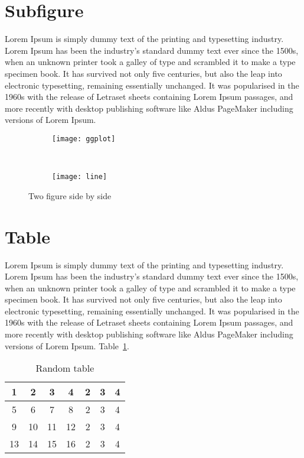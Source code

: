 \section{Subfigure}
Lorem Ipsum is simply dummy text of the printing and typesetting industry. 
Lorem Ipsum has been the industry's standard dummy text ever since the 1500s, 
when an unknown printer took a galley of type and scrambled it to make a type 
specimen book. It has survived not only five centuries, but also the leap into 
electronic typesetting, remaining essentially unchanged. It was popularised in 
the 1960s with the release of Letraset sheets containing Lorem Ipsum passages, 
and more recently with desktop publishing software like Aldus PageMaker 
including versions of Lorem Ipsum.

\begin{figure}
\centering
\begin{subfigure}[b]{0.45\textwidth}
  \centering
  \texttt{[image: ggplot]}
  \caption{}
  \label{fig:im1}
 \end{subfigure}
~
\begin{subfigure}[b]{0.45\textwidth}
  \centering
  \texttt{[image: line]}
  \caption{}
  \label{fig:im2}
\end{subfigure}
\caption{Two figure side by side}
\label{fig:subfigs cap}
\end{figure}

\section{Table}
Lorem Ipsum is simply dummy text of the printing and typesetting industry. 
Lorem Ipsum has been the industry's standard dummy text ever since the 1500s, 
when an unknown printer took a galley of type and scrambled it to make a type 
specimen book. It has survived not only five centuries, but also the leap into 
electronic typesetting, remaining essentially unchanged. It was popularised in 
the 1960s with the release of Letraset sheets containing Lorem Ipsum passages, 
and more recently with desktop publishing software like Aldus PageMaker 
including versions of Lorem Ipsum. Table~\ref{tab: sample}.

\begin{table}
\centering
\caption{Random table}
\label{tab: sample}
\begin{tabular}{|c|c|c|c|c|c|c|}
\hline 
1 & 2 & 3 & 4 & 2 & 3 & 4 \\ \hline 
5 & 6 & 7 & 8 & 2 & 3 & 4 \\ \hline 
9 & 10 & 11 & 12 & 2 & 3 & 4\\ \hline 
13 & 14 & 15 & 16 & 2 & 3 & 4\\ \hline 
\end{tabular} 
\end{table}